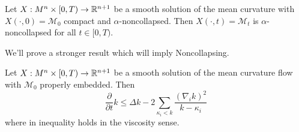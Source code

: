 \begin{thm}[Noncollapsing]
    Let $ X: M^{n} \times [0,T) \to \mathbb{R}^{n+1} $ be a smooth solution of the mean curvature with $ X(\cdot, 0) = \mathcal{M}_{0} $ compact and $ \alpha $-noncollapsed. Then $ X(\cdot,t) = \mathcal{M}_{t} $ is $ \alpha $-noncollapsed for all $t \in [0,T)  $.  
\end{thm}

We'll prove a stronger result which will imply Noncollapsing. 

\begin{thm}
    Let $ X : M^{n} \times [0,T) \to \mathbb{R}^{n+1} $ be a smooth solution of the mean curvature flow with $ \mathcal{M}_{0} $ properly embedded. Then \begin{equation}
        \frac{\partial}{ \partial t}k \le \Delta k -2 \sum_{\kappa_{i}<k}^{} \frac{(\nabla_{i}k)^{2}}{k- \kappa_{i}} 
    \end{equation}
    where in inequality holds in the viscosity sense. 
\end{thm}